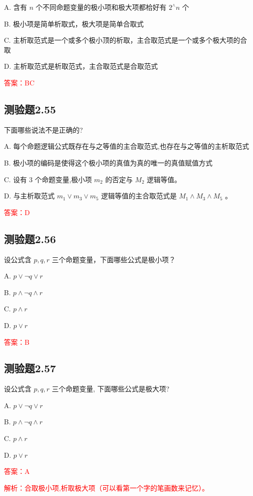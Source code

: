\documentclass[UTF8, heading=true]{ctexart}
\begin{document}
A. 含有 $n$ 个不同命题变量的极小项和极大项都㭘好有 $2^{\wedge} n$ 个

B. 极小项是简单析取式，极大项是简单合取式

C. 主析取范式是一个或多个极小顶的析取，主合取范式是一个或多个极大项的合取

D. 主析取范式是析取范式，主合取范式是合取范式

\textcolor{red}{答案：BC}

\subsection{测验题2.55}

下面哪些说法不是正确的?

A. 每个命题逻辑公式既存在与之等值的主合取范式,也存在与之等值的主析取范式

B. 极小项的编码是使得这个极小项的真值为真的唯一的真值赋值方式

C. 设有 3 个命题变量,极小项 $m_2$ 的否定与 $M_2$ 逻辑等值。

D. 与主析取范式 $m_1 \vee m_3 \vee m_5$ 逻辑等值的主合取范式是 $M_1 \wedge M_3 \wedge M_5$ 。

\textcolor{red}{答案：D}

\subsection{测验题2.56}

设公式含 $p, q, r$ 三个命题变量，下面哪些公式是极小项？

A. $p \vee \neg q \vee r$

B. $p \wedge \neg q \wedge r$

C. $p \wedge r$

D. $p \vee r$

\textcolor{red}{答案：B}

\subsection{测验题2.57}

设公式含 $p, q, r$ 三个命题变量, 下面哪些公式是极大项?

A. $ p \vee \neg q \vee r$

B. $ p \wedge \neg q \wedge r$

C. $ p \wedge r$

D. $ p \vee r$

\textcolor{red}{答案：A}

\textcolor{red}{解析：合取极小项,析取极大项（可以看第一个字的笔画数来记忆）。}
\end{document}
